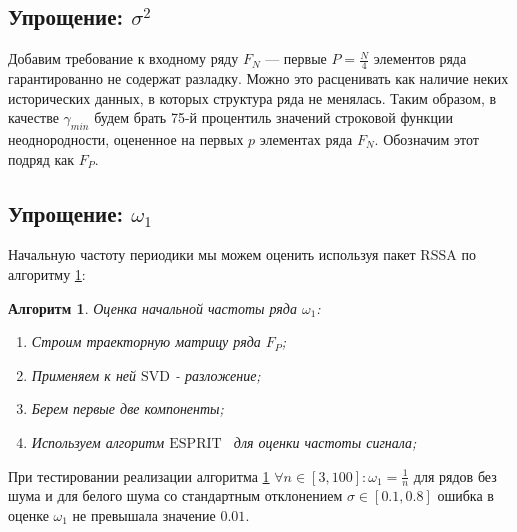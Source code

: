 \documentclass[specialist, substylefile = spbu.rtx,
			   subf, href, 12pt]{disser}
\newtheorem{algorithm}{Алгоритм}
\begin{document}
\subsection{Упрощение: $ \sigma^2 $}
Добавим требование к входному ряду $ F_N $ --- первые $ P = \frac{N}{4} $ элементов ряда гарантированно не содержат разладку. Можно это расценивать как наличие неких исторических данных, в которых структура ряда не менялась. Таким образом, в качестве $ \gamma_{min} $ будем брать 75-й процентиль значений строковой функции неоднородности, оцененное на первых $ p $ элементах ряда $ F_N $. Обозначим этот подряд как $ F_P $.

\subsection{Упрощение: $ \omega_1 $}
Начальную частоту периодики мы можем оценить используя пакет $ \mathrm{RSSA} $ по алгоритму \ref{algo:estimate_omega_1}:
\begin{algorithm}\label{algo:estimate_omega_1}
	Оценка начальной частоты ряда $ \omega_1 $:
	\begin{enumerate}
		\item Строим траекторную матрицу ряда $ F_P $;
		\item Применяем к ней $ \mathrm{SVD} $ - разложение;
		\item Берем первые две компоненты;
		\item Используем алгоритм $ \mathrm{ESPRIT} $~\cite{epsrit} для оценки частоты сигнала;
	\end{enumerate}
\end{algorithm}

При тестировании реализации алгоритма \ref{algo:estimate_omega_1} $ \forall n \in [3, 100]: \omega_1 = \frac{1}{n}$ для рядов без шума и для белого шума со стандартным отклонением $ \sigma \in [0.1, 0.8] $ ошибка в оценке $ \omega_1 $ не превышала значение $ 0.01 $.
\end{document}
